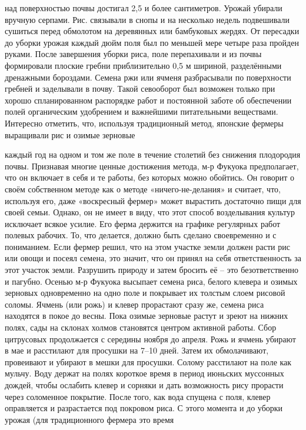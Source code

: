 \documentclass[a4paper]{book}
\begin{document}
над поверхностью почвы достигал 2,5 и более сантиметров. Урожай убирали вручную
серпами. Рис. связывали в снопы и на несколько недель подвешивали сушиться перед
обмолотом на деревянных или бамбуковых жердях. От пересадки до уборки урожая каждый
дюйм поля был по меньшей мере четыре раза пройден руками. После завершения уборки
риса, поле перепахивали и из почвы формировали плоские гребни приблизительно 0,5 м
шириной, разделёнными дренажными бороздами. Семена ржи или ячменя разбрасывали по
поверхности гребней и заделывали в почву. Такой севооборот был возможен только при
хорошо спланированном распорядке работ и постоянной заботе об обеспечении полей
органическим удобрением и важнейшими питательными веществами. Интересно отметить,
что, используя традиционный метод, японские фермеры выращивали рис и озимые зерновые

каждый год на одном и том же поле в течение столетий без снижения плодородия почвы.
Признавая многие ценные достижения метода, м-р Фукуока предполагает, что он
включает в себя и те работы, без которых можно обойтись. Он говорит о своём собственном
методе как о методе «ничего-не-делания» и считает, что, используя его, даже «воскресный
фермер» может вырастить достаточно пищи для своей семьи. Однако, он не имеет в виду, что
этот способ возделывания культур исключает всякое усилие. Его ферма держится на графике
регулярных работ полевых рабочих. То, что делается, должно быть сделано своевременно и с
пониманием. Если фермер решил, что на этом участке земли должен расти рис или овощи и
посеял семена, это значит, что он принял на себя ответственность за этот участок земли.
Разрушить природу и затем бросить её – это безответственно и пагубно.
Осенью м-р Фукуока высыпает семена риса, белого клевера и озимых зерновых
одновременно на одно поле и покрывает их толстым слоем рисовой соломы. Ячмень (или
рожь) и клевер прорастают сразу же, семена риса находятся в покое до весны.
Пока озимые зерновые растут и зреют на нижних полях, сады на склонах холмов
становятся центром активной работы. Сбор цитрусовых продолжается с середины ноября до
апреля.
Рожь и ячмень убирают в мае и расстилают для просушки на 7–10 дней. Затем их
обмолачивают, провеивают и убирают в мешки для просушки. Солому расстилают на поле
как мульчу. Воду держат на полях короткое время в период июньских муссонных дождей,
чтобы ослабить клевер и сорняки и дать возможность рису прорасти через соломенное
покрытие. После того, как вода спущена с поля, клевер оправляется и разрастается под
покровом риса. С этого момента и до уборки урожая (для традиционного фермера это время
\end{document}

